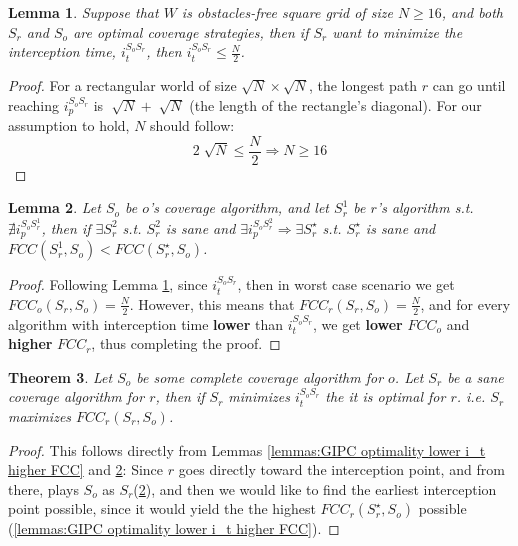 \documentclass[a4paper,10pt]{article}
\newtheorem{theorem}{Theorem}[section]
\newtheorem{lemma}[theorem]{Lemma}
\newcommand\rob{\ensuremath{r}\xspace}
\newcommand\opp{\ensuremath{o}\xspace}
\newcommand{\w}{\ensuremath{W}\xspace}
\newcommand{\fcc}{\ensuremath{FCC}\xspace}
\begin{document}
\begin{lemma}\label{lemmas: bound on interception time}
Suppose that \w is obstacles-free square grid of size $N\geq 16$, and both $S_{\rob}$ and $S_{\opp}$ are optimal coverage strategies, then if $S_{\rob}$ want to minimize the interception time, $i_t^{S_{\opp} S_{\rob}}$, then $i_t^{S_{\opp} S_{\rob}}\leq \frac{N}{2}$.
\end{lemma}
\begin{proof}
For a rectangular world of size $\sqrt{N} \times \sqrt{N}$, the longest path \rob can go until reaching $i_p^{S_{\opp} S_{\rob}}$ is $\sqrt[]{N}+\sqrt[]{N}$ (the length of the rectangle's diagonal). For our assumption to hold, $N$ should follow: \[2\sqrt[]{N}\leq \frac{N}{2}\Rightarrow N\geq 16 \]
\end{proof}

\begin{lemma} \label{lemmas: GIPC optimality prefer S with i_p}
Let $S_{\opp}$ be \opp's coverage algorithm, and let $S_{\rob}^1$ be \rob's algorithm s.t. $\nexists i_p^{S_{\opp} S_{\rob}^1}$, then if $\exists S_{\rob}^2$ s.t. $S_{\rob}^2$ is sane and $\exists i_p^{S_{\opp} S_{\rob}^2}\Rightarrow \exists S_{\rob}^{\star}$ s.t. $S_{\rob}^{\star}$ is sane and $\fcc(S_{\rob}^1, S_{\opp}) < \fcc(S_{\rob}^{\star}, S_{\opp})$.
\end{lemma}

\begin{proof}
Following Lemma \ref{lemmas: bound on interception time}, since $i_t^{S_{\opp} S_{\rob}}$, then in worst case scenario we get $\fcc_{\opp}(S_{\rob}, S_{\opp})=
\frac{N}{2}$. However, this means that $\fcc_{\rob}(S_{\rob}, S_{\opp})=\frac{N}{2}$, and for every algorithm with interception time \textbf{lower} than $i_t^{S_{\opp} S_{\rob}}$, we get \textbf{lower} $\fcc_{\opp}$ and \textbf{higher} $\fcc_{\rob}$, thus completing the proof.
\end{proof}

\begin{theorem}\label{theorems:FullInformationStrategy}
Let $S_{\opp}$ be some complete coverage algorithm for \opp. Let $S_{\rob}$ be a sane coverage algorithm for \rob, then if $S_{\rob}$ minimizes $i_t^{S_{\opp} S_{\rob}}$ the it is optimal for \rob. i.e. $S_{\rob}$ maximizes $\fcc_{\rob}(S_{\rob}, S_{\opp})$.
\end{theorem}
\begin{proof}
This follows directly from Lemmas \ref{lemmas:GIPC optimality lower i_t higher FCC}  and \ref{lemmas: GIPC optimality prefer S with i_p}: Since \rob goes directly toward the interception point, and from there, plays $S_{\opp}$ as $S_{\rob}$(\ref{lemmas: GIPC optimality prefer S with i_p}), and then we would like to find the earliest interception point possible, since it would yield the the highest $\fcc_{\rob}(S_{\rob}^\star, S_{\opp})$ possible (\ref{lemmas:GIPC optimality lower i_t higher FCC}).
\end{proof}
\end{document}
